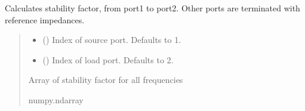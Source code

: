 \documentclass[letterpaper,10pt,english]{sphinxmanual}
\begin{document}
\begin{fulllineitems}
\begin{fulllineitems}
\end{fulllineitems}


\begin{fulllineitems}
\label{\detokenize{touchstone:touchstone.spfile.stability_factor_k}}
\pysigstartsignatures
{}
\pysigstopsignatures
\sphinxAtStartPar
Calculates  stability factor, from port1 to port2. Other ports are terminated with reference impedances.
\begin{quote}\begin{description}
\begin{itemize}
\item {}
\sphinxAtStartPar
{} (\sphinxstyleliteralemphasis{\sphinxupquote{, }}) \textendash{} Index of source port. Defaults to 1.

\item {}
\sphinxAtStartPar
{} (\sphinxstyleliteralemphasis{\sphinxupquote{, }}) \textendash{} Index of load port. Defaults to 2.

\end{itemize}

\sphinxAtStartPar
Array of stability factor for all frequencies

\sphinxAtStartPar
numpy.ndarray

\end{description}\end{quote}

\end{fulllineitems}



\end{fulllineitems}
\end{document}
